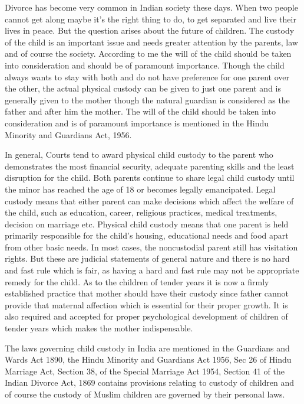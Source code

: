 \begin{multicols}{2}
\noi
Divorce has become very common in Indian society these days. When two people cannot get
along maybe it’s the right thing to do, to get separated and live their lives in peace. But the
question arises about the future of children. The custody of the child is an important issue and
needs greater attention by the parents, law and of course the society. According to me the will of
the child should be taken into consideration and should be of paramount importance. Though the
child always wants to stay with both and do not have preference for one parent over the other, the
actual physical custody can be given to just one parent and is generally given to the mother though
the natural guardian is considered as the father and after him the mother. The will of the child
should be taken into consideration and is of paramount importance is mentioned in the Hindu
Minority and Guardians Act, 1956.

\noi
In general, Courts tend to award physical child custody to the parent who demonstrates the most
financial security, adequate parenting skills and the least disruption for the child. Both parents
continue to share legal child custody until the minor has reached the age of 18 or becomes legally
emancipated. Legal custody means that either parent can make decisions which affect the welfare
of the child, such as education, career, religious practices, medical treatments, decision on
marriage etc. Physical child custody means that one parent is held primarily responsible for the
child's housing, educational needs and food apart from other basic needs. In most cases, the noncustodial parent still has visitation rights. But these are judicial statements of general nature and
there is no hard and fast rule which is fair, as having a hard and fast rule may not be appropriate
remedy for the child. As to the children of tender years it is now a firmly established practice that
mother should have their custody since father cannot provide that maternal affection which is
essential for their proper growth. It is also required and accepted for proper psychological
development of children of tender years which makes the mother indispensable.

\noi
The laws governing child custody in India are mentioned in the Guardians and Wards Act 1890,
the Hindu Minority and Guardians Act 1956, Sec 26 of Hindu Marriage Act, Section 38, of the 
Special Marriage Act 1954, Section 41 of the Indian Divorce Act, 1869 contains provisions
relating to custody of children and of course the custody of Muslim children are governed by their
personal laws.


\end{multicols}

